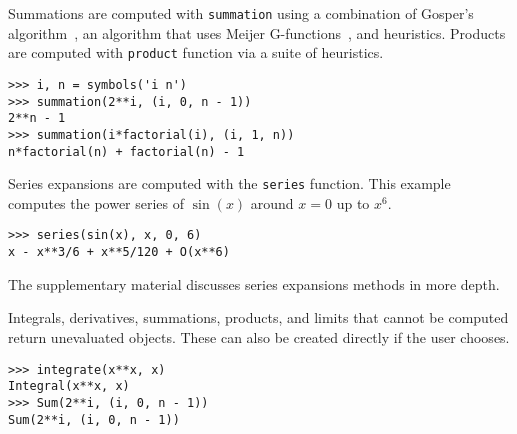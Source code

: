 Summations are computed with \verb|summation|  using a combination of Gosper's
algorithm~\cite{gosper1978decision}, an algorithm that uses Meijer
G-functions~\cite{Roach1996hyper,roach1997meijerg}, and heuristics. Products
are computed with \verb|product| function via a suite of heuristics.
\begin{verbatim}
>>> i, n = symbols('i n')
>>> summation(2**i, (i, 0, n - 1))
2**n - 1
>>> summation(i*factorial(i), (i, 1, n))
n*factorial(n) + factorial(n) - 1
\end{verbatim}

Series expansions are computed with the \verb|series| function. This example computes the power series of $\sin(x)$ around $x=0$ up to $x^6$.
\begin{verbatim}
>>> series(sin(x), x, 0, 6)
x - x**3/6 + x**5/120 + O(x**6)
\end{verbatim}
The supplementary material discusses series expansions methods in more depth.

Integrals, derivatives, summations, products, and limits that cannot be
computed return unevaluated objects. These can also be created directly if the
user chooses.
\begin{verbatim}
>>> integrate(x**x, x)
Integral(x**x, x)
>>> Sum(2**i, (i, 0, n - 1))
Sum(2**i, (i, 0, n - 1))
\end{verbatim}

